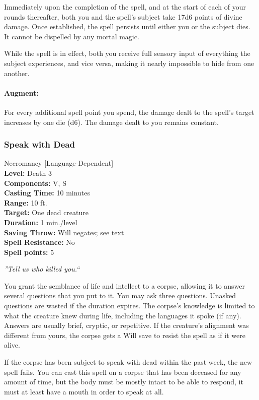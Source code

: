 Immediately upon the completion of the spell, and at the start of each of your rounds thereafter, both you and the spell's subject take 17d6 points of divine damage.
Once established, the spell persists until either you or the subject dies. It cannot be dispelled by any mortal magic.

While the spell is in effect, both you receive full sensory input of everything the subject experiences, and vice versa, making it nearly impossible to hide from one another.

\paragraph{Augment:} For every additional spell point you spend, the damage dealt to the spell's target increases by one die (d6). The damage dealt to you remains constant.
\subsubsection{Speak with Dead}
\label{Spell:SpeakWithDead}
Necromancy [Language-Dependent]
\\ \textbf{Level:} Death 3
\\ \textbf{Components:} V, S
\\ \textbf{Casting Time:} 10 minutes
\\ \textbf{Range:} 10 ft.
\\ \textbf{Target:} One dead creature
\\ \textbf{Duration:} 1 min./level
\\ \textbf{Saving Throw:} Will negates; see text
\\ \textbf{Spell Resistance:} No
\\ \textbf{Spell points:} 5

\emph{''Tell us who killed you.``}

You grant the semblance of life and intellect to a corpse, allowing it to answer several questions that you put to it. 
You may ask three questions. Unasked questions are wasted if the duration expires. 
The corpse's knowledge is limited to what the creature knew during life, including the languages it spoke (if any). 
Answers are usually brief, cryptic, or repetitive. If the creature's alignment was different from yours, the corpse gets a Will save to resist the spell as if it were alive.

If the corpse has been subject to speak with dead within the past week, the new spell fails. 
You can cast this spell on a corpse that has been deceased for any amount of time, but the body must be mostly intact to be able to respond, it must at least have a mouth in order to speak at all.

